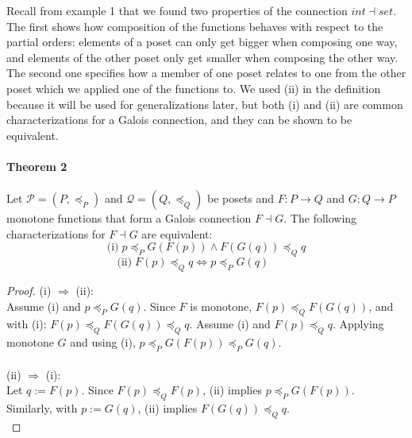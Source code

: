 	
	Recall from example 1 that we found two properties of the connection $int \dashv set$. The first shows how composition of the functions behaves with respect to the partial orders: elements of a poset can only get bigger when composing one way, and elements of the other poset only get smaller when composing the other way. The second one specifies how a member of one poset relates to one from the other poset which we applied one of the functions to. We used (ii) in the definition because it will be used for generalizations later, but both (i) and (ii) are common characterizations for a Galois connection, and they can be shown to be equivalent.
	\\

\paragraph{Theorem 2}  
	Let $\mathcal{P} = (P, \preceq_P)$ and $\mathcal{Q} = (Q, \preceq_Q)$ be posets and $F: P \rightarrow Q$ and $G: Q \rightarrow P$ monotone functions that form a Galois connection $F \dashv G$. The following characterizations for $F \dashv G$ are equivalent:
	\[\text{(i)}\;p \preceq_P G (F (p)) \land F(G (q)) \preceq_Q q\]
	\[\text{(ii)}\;  F(p) \preceq_Q q \Leftrightarrow p \preceq_P G(q)\;\;\;\;\;\;\;\;\,\]

\begin{proof}  
	(i) $\Rightarrow$ (ii):\\
	Assume (i) and $p \preceq_P G(q)$. Since $F$ is monotone, $F(p) \preceq_Q F(G(q))$, and with (i):  $F(p) \preceq_Q F(G(q)) \preceq_Q q$.
	Assume (i) and $F(p) \preceq_Q q$. Applying monotone $G$ and using (i), $ p \preceq_P G(F(p)) \preceq_P G(q)$.\\ \\
	(ii) $\Rightarrow$ (i): \\Let $q := F(p)$. Since $F(p) \preceq_Q F(p)$, (ii) implies $p \preceq_P G (F (p))$. \\
	Similarly, with $p := G(q)$,  (ii) implies $F(G (q)) \preceq_Q q$.\\
\end{proof}


\vspace{\baselineskip}
